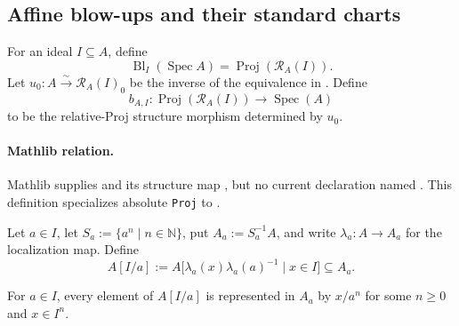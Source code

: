 \subsection{Affine blow-ups and their standard charts}

\begin{definition}
  \label{def:nagata-affine-blowup}

  For an ideal $I\subseteq A$, define
  \[
    \operatorname{Bl}_I(\operatorname{Spec}A)
      =\operatorname{Proj}(\mathcal R_A(I)).
  \]
  Let $u_0\colon A\xrightarrow{\sim}\mathcal R_A(I)_0$ be the inverse of
  the equivalence in .  Define
  \[
    b_{A,I}\colon\operatorname{Proj}(\mathcal R_A(I))\longrightarrow
      \operatorname{Spec}(A)
  \]
  to be the relative-Proj structure morphism determined by $u_0$.

  \paragraph{Mathlib relation.}
  Mathlib supplies \texttt{} and its
  structure map \texttt{}, but no current
  declaration named \texttt{}.
  This definition specializes absolute \texttt{Proj} to
  \texttt{}.
\end{definition}

\begin{definition}
  \label{def:nagata-blowup-chart-ring}

  Let $a\in I$, let $S_a:=\{a^n\mid n\in\mathbb N\}$, put
  $A_a:=S_a^{-1}A$, and write $\lambda_a\colon A\to A_a$ for the localization
  map.  Define
  \[
    A[I/a]:=A\bigl[\lambda_a(x)\lambda_a(a)^{-1}\mid x\in I\bigr]
      \subseteq A_a.
  \]
\end{definition}

\begin{lemma}
  \label{lemma:nagata-chart-ring-normal-form}

  For $a\in I$, every element of $A[I/a]$ is represented in $A_a$ by $x/a^n$ for some
  $n\geq 0$ and $x\in I^n$.
\end{lemma}

